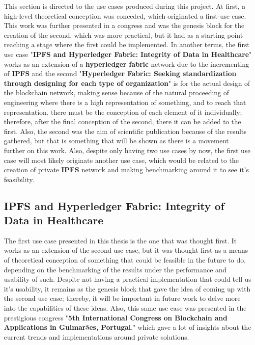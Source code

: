 This section is directed to the use cases produced during this project. At first, a high-level theoretical conception was conceded, which originated a first-use case. This work was further presented in a congress and was the genesis block for the creation of the second, which was more practical, but it had as a starting point reaching a stage where the first could be implemented. In another terms, the first use case "\textbf{IPFS and Hyperledger Fabric: Integrity of Data in Healthcare}" works as an extension of a \textbf{hyperledger fabric} network due to the incrementing of \textbf{IPFS} and the second "\textbf{Hyperledger Fabric: Seeking standardization through designing for each type of
organization}" is for the actual design of the blockchain network, making sense because of the natural proceeding of engineering where there is a high representation of something, and to reach that representation, there must be the conception of each element of it individually; therefore, after the final conception of the second, there it can be added to the first. Also, the second was the aim of scientific publication because of the results gathered, but that is something that will be shown as there is a movement further on this work. Also, despite only having two use cases by now, the first use case will most likely originate another use case, which would be related to the creation of private \textbf{IPFS} network and making benchmarking around it to see it's feasibility.

\subsection{IPFS and Hyperledger Fabric: Integrity of Data in Healthcare}
The first use case presented in this thesis is the one that was thought first. It works as an extension of the second use case, but it was thought first as a means of theoretical conception of something that could be feasible in the future to do, depending on the benchmarking of the results under the performance and usability of such. Despite not having a practical implementation that could tell us it's usability, it remains as the genesis block that gave the idea of coming up with the second use case; thereby, it will be important in future work to delve more into the capabilities of these ideas. Also, this same use case was presented in the prestigious congress "\textbf{5th International Congress on Blockchain and Applications in Guimarães, Portugal}," which gave a lot of insights about the current trends and implementations around private solutions.

